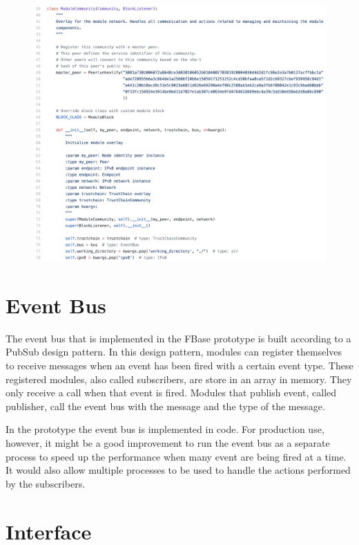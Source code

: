\begin{figure}[h!]
	\centering
	\includegraphics[width=\textwidth]{images/code-community-class.png}
	\caption{\label{fig:community-code}}
\end{figure}

\section{Event Bus}

The event bus that is implemented in the FBase prototype is built according to a PubSub design pattern. In this design pattern, modules can register themselves to receive messages when an event has been fired with a certain event type. These registered modules, also called subscribers, are store in an array in memory. They only receive a call when that event is fired. Modules that publish event, called publisher, call the event bus with the message and the type of the message.

In the prototype the event bus is implemented in code. For production use, however, it might be a good improvement to run the event bus as a separate process to speed up the performance when many event are being fired at a time. It would also allow multiple processes to be used to handle the actions performed by the subscribers. 

\section{Interface}

